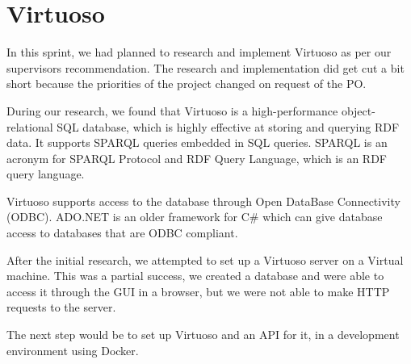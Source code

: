 \section{Virtuoso}
In this sprint, we had planned to research and implement Virtuoso as per our supervisors recommendation.
The research and implementation did get cut a bit short because the priorities of the \knox{} project changed on request of the PO.

During our research, we found that Virtuoso is a high-performance object-relational SQL database, which is highly effective at storing and querying RDF data. It supports SPARQL queries embedded in SQL queries. SPARQL is an acronym for SPARQL Protocol and RDF Query Language, which is an RDF query language.


Virtuoso supports access to the database through Open DataBase Connectivity (ODBC).
ADO.NET is an older framework for C\# which can give database access to databases that are ODBC compliant.


After the initial research, we attempted to set up a Virtuoso server on a Virtual machine. This was a partial success, we created a database and were able to access it through the GUI in a browser, but we were not able to make HTTP requests to the server.

The next step would be to set up Virtuoso and an API for it, in a development environment using Docker.
